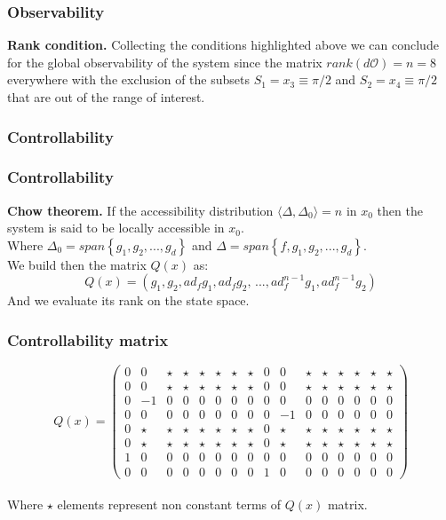 %
\begin{frame}
\frametitle{Observability}
\textbf{Rank condition.} Collecting the conditions highlighted above we can conclude for the global observability of the system since the matrix $rank(d\mathcal{O}) = n = 8$ everywhere with the exclusion of the subsets $S_1 = x_3\equiv\pi/2$ and $S_2 = x_4\equiv\pi/2$ that are out of the range of interest.
\end{frame}
%
\subsubsection{Controllability}
\begin{frame}
\frametitle{Controllability}
\textbf{Chow theorem.} If the accessibility distribution $\langle\Delta, \Delta_0\rangle = n$ in $x_0$ then the system is said to be locally accessible in $x_0$.\\
\vspace{.8cm}
Where $\Delta_0 = span\left\{g_1, g_2,..., g_d\right\}$ and $\Delta = span\left\{f, g_1, g_2,..., g_d\right\}$.\\
\vspace{.8cm}
We build then the matrix $Q(x)$ as:
\begin{equation}
	Q(x) = (g_1, g_2, ad_fg_1, ad_fg_2,\,...,ad^{n-1}_fg_1,ad^{n-1}_fg_2)
\end{equation}
And we evaluate its rank on the state space.
\end{frame}
\begin{frame}
\frametitle{Controllability matrix}
\begin{equation*}
	Q(x) =%
	\begin{pmatrix}
		0 &0  &\star &\star &\star &\star &\star &\star &0 &0 &\star &\star &\star &\star &\star &\star \\
		0 &0  &\star &\star &\star &\star &\star &\star &0 &0 &\star &\star &\star &\star &\star &\star \\
		0 &-1 &0 &0 &0 &0 &0 &0 &0 &0 &0 &0 &0 &0 &0 &0 \\
		0 &0  &0 &0 &0 &0 &0 &0 &0 &-1 &0 &0 &0 &0 &0 &0 \\
		0 &\star &\star &\star &\star &\star &\star &\star &0 &\star &\star &\star &\star &\star &\star &\star \\
		0 &\star &\star &\star &\star &\star &\star &\star &0 &\star &\star &\star &\star &\star &\star &\star \\
		1 &0  &0 &0 &0 &0 &0 &0 &0 &0 &0 &0 &0 &0 &0 &0 \\
		0 &0  &0 &0 &0 &0 &0 &0 &1 &0 &0 &0 &0 &0 &0 &0
	\end{pmatrix}
\end{equation*}\\[10pt]
Where $\star$ elements represent non constant terms of $Q(x)$ matrix.
\end{frame}
